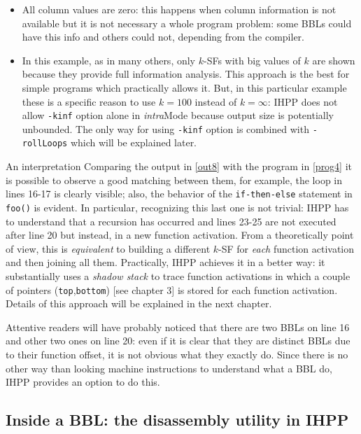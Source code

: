 \documentclass[a4paper,11pt]{report}
\begin{document}
\begin{itemize}
\item All column values are zero: this happens when 
column information is not available but it is not necessary a whole program 
problem: some BBLs could have this info and others could not, depending from the compiler.
\item In this example, as in many others, only $k$-SFs with big values of $k$
are shown because they provide full information analysis. This approach is the best for 
simple programs which practically allows it. 
But, in this particular example these is a specific reason to use $k=100$ instead of $k=\infty$: IHPP does not allow \verb|-kinf| option alone in \emph{intra}Mode because
output size is potentially unbounded. The only way for using \verb|-kinf| option is combined with \verb|-rollLoops| which will be explained later.
\end{itemize}
\renewcommand{\labelitemi}{$\bullet$}

\begin{paragraph}{An interpretation}
Comparing the output in \cref{out8} with the program in \cref{prog4} it is possible to 
observe a good matching between them, for example, the loop in lines 16-17 
is clearly visible; also, the behavior of the \verb|if-then-else| statement in \verb|foo()| is evident. In particular, recognizing this last one is not trivial: 
IHPP has to understand that a recursion has occurred and lines 23-25
are not executed after line 20 but instead, in a new function activation. 
From a theoretically point of view, 
this is \emph{equivalent} to building a different $k$-SF
for \emph{each} function activation and then joining all them. 
Practically, IHPP achieves it in a better way: 
it substantially uses a \emph{shadow stack} to trace function activations in which
a couple of pointers (\verb|top|,\verb|bottom|) [see chapter 3] is stored for each 
function activation. Details of this approach will be explained in the next chapter.
\end{paragraph}

Attentive readers will have probably noticed that there are two BBLs on line 16 
and other two ones on line 20: even if it is clear that they are distinct 
BBLs due to their function offset, it is not obvious what they exactly do.
Since there is no other way than looking machine instructions to understand 
what a BBL do, IHPP provides an option to do this.

\subsection{Inside a BBL: the disassembly utility in IHPP}
\end{document}

